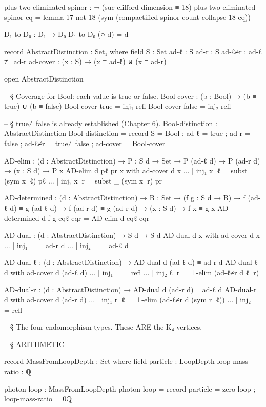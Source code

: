 \documentclass[11pt,a4paper]{book}
\begin{document}
\begin{code}
plus-two-eliminated-spinor : ¬ (suc clifford-dimension ≡ 18)
plus-two-eliminated-spinor eq = lemma-17-not-18 (sym (compactified-spinor-count-collapse 18 eq))

D₁-to-D₀ : D₁ → D₀
D₁-to-D₀ (○ d) = d

record AbstractDistinction : Set₁ where
  field
    S     : Set
    ad-ℓ  : S
    ad-r  : S
    ad-ℓ≠r : ad-ℓ ≢ ad-r
    ad-cover : (x : S) → (x ≡ ad-ℓ) ⊎ (x ≡ ad-r)

open AbstractDistinction

-- § Coverage for Bool: each value is true or false.
Bool-cover : (b : Bool) → (b ≡ true) ⊎ (b ≡ false)
Bool-cover true  = inj₁ refl
Bool-cover false = inj₂ refl

-- § true≢false is already established (Chapter 6).
Bool-distinction : AbstractDistinction
Bool-distinction = record
  { S      = Bool
  ; ad-ℓ   = true
  ; ad-r   = false
  ; ad-ℓ≠r = true≢false
  ; ad-cover = Bool-cover
  }

AD-elim : (d : AbstractDistinction) →
          {P : S d → Set} →
          P (ad-ℓ d) → P (ad-r d) →
          (x : S d) → P x
AD-elim d pℓ pr x with ad-cover d x
... | inj₁ x≡ℓ = subst _ (sym x≡ℓ) pℓ
... | inj₂ x≡r = subst _ (sym x≡r) pr

AD-determined : (d : AbstractDistinction) →
                {B : Set} →
                (f g : S d → B) →
                f (ad-ℓ d) ≡ g (ad-ℓ d) →
                f (ad-r d) ≡ g (ad-r d) →
                (x : S d) → f x ≡ g x
AD-determined d f g eqℓ eqr = AD-elim d eqℓ eqr

AD-dual : (d : AbstractDistinction) → S d → S d
AD-dual d x with ad-cover d x
... | inj₁ _ = ad-r d
... | inj₂ _ = ad-ℓ d

AD-dual-ℓ : (d : AbstractDistinction) → AD-dual d (ad-ℓ d) ≡ ad-r d
AD-dual-ℓ d with ad-cover d (ad-ℓ d)
... | inj₁ _   = refl
... | inj₂ ℓ≡r = ⊥-elim (ad-ℓ≠r d ℓ≡r)

AD-dual-r : (d : AbstractDistinction) → AD-dual d (ad-r d) ≡ ad-ℓ d
AD-dual-r d with ad-cover d (ad-r d)
... | inj₁ r≡ℓ = ⊥-elim (ad-ℓ≠r d (sym r≡ℓ))
... | inj₂ _   = refl

-- § The four endomorphism types. These ARE the K₄ vertices.


-- § ARITHMETIC

record MassFromLoopDepth : Set where
  field
    particle : LoopDepth
    loop-mass-ratio : ℚ

photon-loop : MassFromLoopDepth
photon-loop = record { particle = zero-loop ; loop-mass-ratio = 0ℚ }


\end{code}
\end{document}
